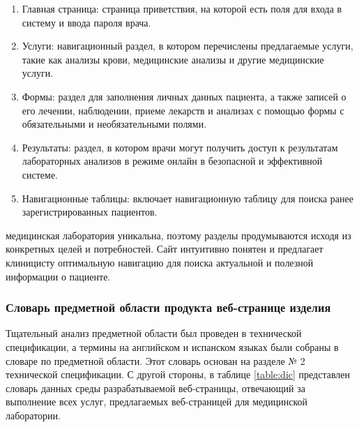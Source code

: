 \begin{enumerate}
	\item Главная страница: страница приветствия, на которой есть поля для входа в систему и ввода пароля врача.
	\item Услуги: навигационный раздел, в котором перечислены предлагаемые услуги, такие как анализы крови, медицинские анализы и другие медицинские услуги.
	\item Формы: раздел для заполнения личных данных пациента, а также записей о его лечении, наблюдении, приеме лекарств и анализах с помощью формы с обязательными и необязательными полями.
	\item Результаты: раздел, в котором врачи могут получить доступ к результатам лабораторных анализов в режиме онлайн в безопасной и эффективной системе.
	\item Навигационные таблицы: включает навигационную таблицу для поиска ранее зарегистрированных пациентов.
\end{enumerate}

медицинская лаборатория уникальна, поэтому разделы продумываются исходя из конкретных целей и потребностей. Сайт интуитивно понятен и предлагает клиницисту оптимальную навигацию для поиска актуальной и полезной информации о пациенте.

\subsubsection{Словарь предметной области продукта веб-странице изделия}

Тщательный анализ предметной области был проведен в технической спецификации, а термины на английском и испанском языках были собраны в словаре по предметной области. Этот словарь основан на разделе № 2 технической спецификации. С другой стороны, в таблице \ref{table:dic} представлен словарь данных среды разрабатываемой веб-страницы, отвечающий за выполнение всех услуг, предлагаемых веб-страницей для медицинской лаборатории.


